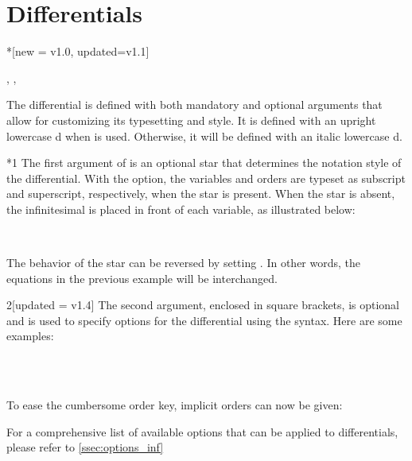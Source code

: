 	
	\clearpage
	\section{Differentials}\label{sec:differential}

\begin{function}*{\odif}[new = v1.0, updated=v1.1]
	\begin{syntax}
		\sarg, , 
	\end{syntax}
	The differential  is defined with both mandatory and optional arguments that allow for customizing its typesetting and style. It is defined with an upright lowercase d when  is used. Otherwise, it will be defined with an italic lowercase d.
	\begin{definition}
	\end{definition}
	
	\begin{argument}*{1}
		The first argument of  is an optional star that determines the notation style of the differential. With the  option, the variables and orders are typeset as subscript and superscript, respectively, when the star is present. When the star is absent, the infinitesimal is placed in front of each variable, as illustrated below:
		\begin{example}
			 \\
		\end{example}
		The behavior of the star can be reversed by setting . In other words, the equations in the previous example will be interchanged.
	\end{argument}
	
	\begin{argument}{2}[updated = v1.4]
		The second argument, enclosed in square brackets, is optional and is used to specify options for the differential using the  syntax. Here are some examples:
		\begin{example}
			\odif[order={n,3}]{x,y,z} \\
			\odif[sep-var-inf=0]{x,y,z} \\
			\odif*[sep-var-var=0]{x,y,z}
		\end{example}
		To ease the cumbersome order key, implicit orders can now be given:
		\begin{example}
			\odif[n+2, \alpha]{x,y,z}
		\end{example}
		For a comprehensive list of available options that can be applied to differentials, please refer to \cref{ssec:options_inf}
	\end{argument}
	

\end{function}
